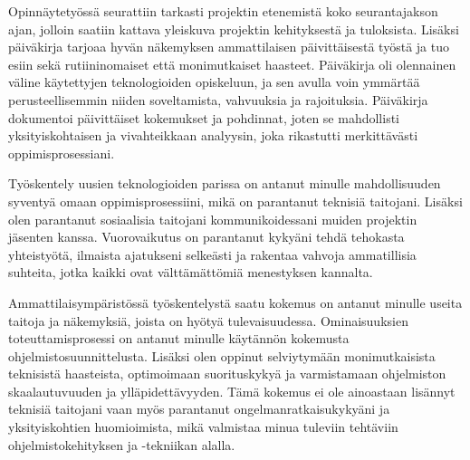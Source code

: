 \documentclass[11pt,a4paper,titlepage,oneside]{article}
\begin{document}

%




Opinnäytetyössä seurattiin tarkasti projektin etenemistä koko seurantajakson ajan,
jolloin saatiin kattava yleiskuva projektin kehityksestä ja tuloksista.
Lisäksi päiväkirja tarjoaa hyvän näkemyksen ammattilaisen päivittäisestä työstä ja tuo esiin sekä rutiininomaiset että monimutkaiset haasteet. 
Päiväkirja oli olennainen väline käytettyjen teknologioiden opiskeluun,
ja sen avulla voin ymmärtää perusteellisemmin niiden soveltamista, vahvuuksia ja rajoituksia. 
Päiväkirja dokumentoi päivittäiset kokemukset ja pohdinnat,
joten se mahdollisti yksityiskohtaisen ja vivahteikkaan analyysin, joka rikastutti merkittävästi oppimisprosessiani.
\medskip





Työskentely uusien teknologioiden parissa on antanut minulle mahdollisuuden syventyä omaan oppimisprosessiini, 
mikä on parantanut teknisiä taitojani.
Lisäksi olen parantanut sosiaalisia taitojani kommunikoidessani muiden projektin jäsenten kanssa.
Vuorovaikutus on parantanut kykyäni tehdä tehokasta yhteistyötä,
ilmaista ajatukseni selkeästi ja rakentaa vahvoja ammatillisia suhteita,
jotka kaikki ovat välttämättömiä menestyksen kannalta. \\
\medskip



Ammattilaisympäristössä työskentelystä saatu kokemus on antanut minulle useita taitoja ja näkemyksiä, 
joista on hyötyä tulevaisuudessa.
Ominaisuuksien toteuttamisprosessi on antanut minulle käytännön kokemusta ohjelmistosuunnittelusta. 
Lisäksi olen oppinut selviytymään monimutkaisista teknisistä haasteista,
optimoimaan suorituskykyä ja varmistamaan ohjelmiston skaalautuvuuden ja ylläpidettävyyden.
Tämä kokemus ei ole ainoastaan lisännyt teknisiä taitojani vaan myös parantanut ongelmanratkaisukykyäni ja yksityiskohtien huomioimista, 
mikä valmistaa minua tuleviin tehtäviin ohjelmistokehityksen ja -tekniikan alalla.

\medskip



\end{document}
